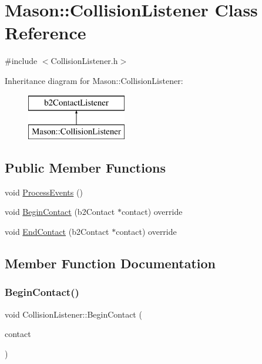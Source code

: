 \hypertarget{class_mason_1_1_collision_listener}{}\section{Mason\+:\+:Collision\+Listener Class Reference}
\label{class_mason_1_1_collision_listener}


{\ttfamily \#include $<$Collision\+Listener.\+h$>$}

Inheritance diagram for Mason\+:\+:Collision\+Listener\+:\begin{figure}[H]
\begin{center}
\leavevmode
\includegraphics[height=2.000000cm]{class_mason_1_1_collision_listener}
\end{center}
\end{figure}
\subsection*{Public Member Functions}
\begin{DoxyCompactItemize}
\item 
void \hyperlink{class_mason_1_1_collision_listener_a10c4d83465cd2a9f6dd9d6e4dfba2834}{Process\+Events} ()
\item 
void \hyperlink{class_mason_1_1_collision_listener_ac65851c3fa2d3ee90d287fca613e20be}{Begin\+Contact} (b2\+Contact $\ast$contact) override
\item 
void \hyperlink{class_mason_1_1_collision_listener_a41a2b9775c5814c1446ceffdeb009640}{End\+Contact} (b2\+Contact $\ast$contact) override
\end{DoxyCompactItemize}


\subsection{Member Function Documentation}
\hypertarget{class_mason_1_1_collision_listener_ac65851c3fa2d3ee90d287fca613e20be}{}\label{class_mason_1_1_collision_listener_ac65851c3fa2d3ee90d287fca613e20be} 
\subsubsection{\texorpdfstring{Begin\+Contact()}{BeginContact()}}
{\footnotesize\ttfamily void Collision\+Listener\+::\+Begin\+Contact (\begin{DoxyParamCaption}\item[{b2\+Contact $\ast$}]{contact }\end{DoxyParamCaption})\hspace{0.3cm}{\ttfamily [override]}}

